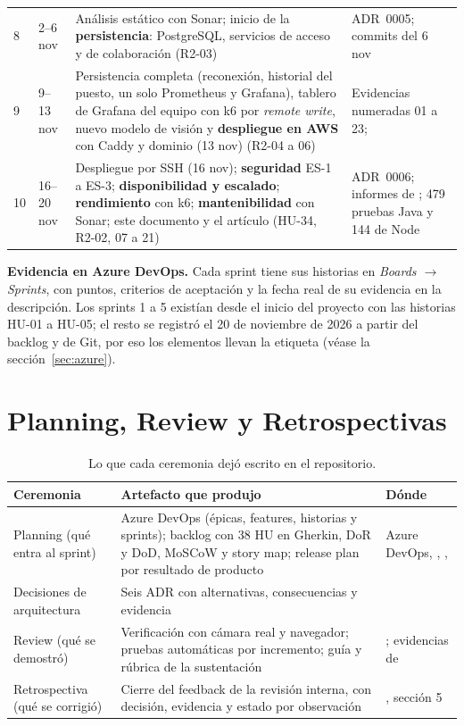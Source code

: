 \begin{table}[H]
\begin{tabularx}{\textwidth}{lp{2.1cm}YY}
8 & 2--6 nov & Análisis estático con Sonar; inicio de la \textbf{persistencia}: PostgreSQL, servicios de acceso y de colaboración (R2-03) & ADR~0005; commits del 6 nov \\
9 & 9--13 nov & Persistencia completa (reconexión, historial del puesto, un solo Prometheus y Grafana), tablero de Grafana del equipo con k6 por \emph{remote write}, nuevo modelo de visión y \textbf{despliegue en AWS} con Caddy y dominio (13 nov) (R2-04 a 06) & Evidencias numeradas 01 a 23;  \\
10 & 16--20 nov & Despliegue por SSH (16 nov); \textbf{seguridad} ES-1 a ES-3; \textbf{disponibilidad y escalado}; \textbf{rendimiento} con k6; \textbf{mantenibilidad} con Sonar; este documento y el artículo (HU-34, R2-02, 07 a 21) & ADR~0006; informes de ; 479 pruebas Java y 144 de Node \\
\bottomrule
\end{tabularx}
\end{table}

\textbf{Evidencia en Azure DevOps.} Cada sprint tiene sus historias en \emph{Boards $\rightarrow$ Sprints}, con puntos, criterios de aceptación y la fecha real de
su evidencia en la descripción. Los sprints 1 a 5 existían desde el inicio del proyecto con las historias HU-01 a HU-05; el resto se registró el 20 de
noviembre de 2026 a partir del backlog y de Git, por eso los elementos llevan la etiqueta  (véase la sección~\ref{sec:azure}).

\section{Planning, Review y Retrospectivas}
\begin{table}[H]
\centering\small
\caption{Lo que cada ceremonia dejó escrito en el repositorio.}\label{tab:ceremonias}
\begin{tabularx}{\textwidth}{lYY}
\toprule
\textbf{Ceremonia} & \textbf{Artefacto que produjo} & \textbf{Dónde} \\
\midrule
Planning (qué entra al sprint) & Azure DevOps (épicas, features, historias y sprints); backlog con 38 HU en Gherkin, DoR y DoD, MoSCoW y story map; release plan por resultado de producto & Azure DevOps, , ,  \\
Decisiones de arquitectura & Seis ADR con alternativas, consecuencias y evidencia &  \\
Review (qué se demostró) & Verificación con cámara real y navegador; pruebas automáticas por incremento; guía y rúbrica de la sustentación & ; evidencias de  \\
Retrospectiva (qué se corrigió) & Cierre del feedback de la revisión interna, con decisión, evidencia y estado por observación & , sección 5 \\
\bottomrule
\end{tabularx}
\end{table}

